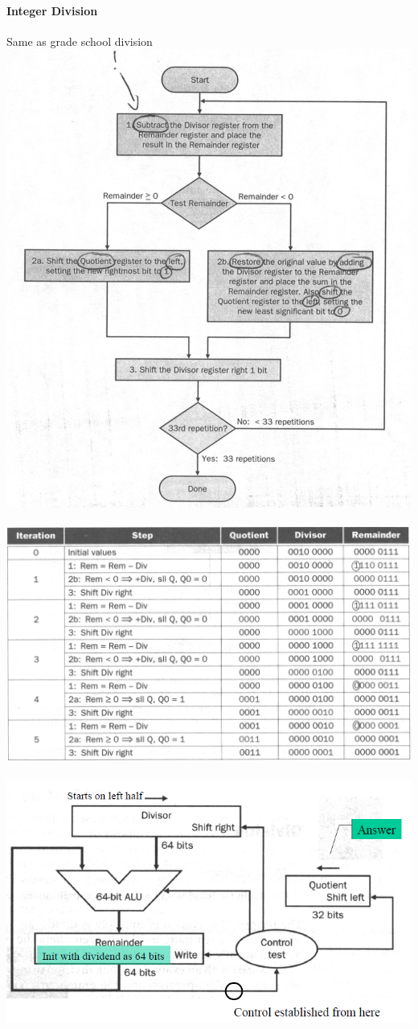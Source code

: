 \documentclass[12 pt]{article}
\begin{document}
\paragraph{Integer Division} Same as grade school division\\
\includegraphics[scale=0.2]{dvf}
\\~ \includegraphics[scale=0.4]{dva}
\\~ \includegraphics[scale=0.7]{idc}
\end{document}

